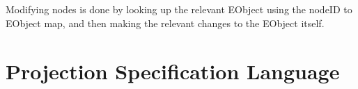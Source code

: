 \documentclass{article}
\begin{document}
{\\
\\
Modifying nodes is done by looking up the relevant EObject using the nodeID to EObject map, and then making the relevant changes to the EObject itself.

\section{Projection Specification Language}\label{EditorLanguage}
}
\end{document}
